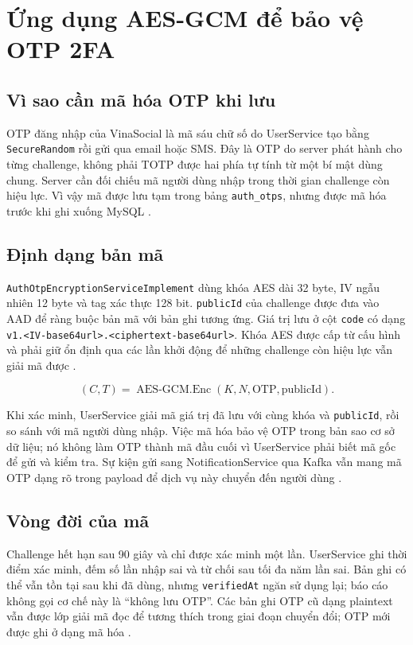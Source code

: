 \section{Ứng dụng AES-GCM để bảo vệ OTP 2FA}
\subsection{Vì sao cần mã hóa OTP khi lưu}
OTP đăng nhập của VinaSocial là mã sáu chữ số do UserService tạo bằng \texttt{SecureRandom} rồi gửi qua email hoặc SMS. Đây là OTP do server phát hành cho từng challenge, không phải TOTP được hai phía tự tính từ một bí mật dùng chung. Server cần đối chiếu mã người dùng nhập trong thời gian challenge còn hiệu lực. Vì vậy mã được lưu tạm trong bảng \texttt{auth\_otps}, nhưng được mã hóa trước khi ghi xuống MySQL \cite{twofa}.

\subsection{Định dạng bản mã}
\texttt{AuthOtpEncryptionServiceImplement} dùng khóa AES dài 32 byte, IV ngẫu nhiên 12 byte và tag xác thực 128 bit. \texttt{publicId} của challenge được đưa vào AAD để ràng buộc bản mã với bản ghi tương ứng. Giá trị lưu ở cột \texttt{code} có dạng \texttt{v1.<IV-base64url>.<ciphertext-base64url>}. Khóa AES được cấp từ cấu hình và phải giữ ổn định qua các lần khởi động để những challenge còn hiệu lực vẫn giải mã được \cite{twofa}.

\begin{equation}
  (C,T)=\operatorname{AES\mbox{-}GCM.Enc}(K,N,\mathrm{OTP},\mathrm{publicId}).
\end{equation}

Khi xác minh, UserService giải mã giá trị đã lưu với cùng khóa và \texttt{publicId}, rồi so sánh với mã người dùng nhập. Việc mã hóa bảo vệ OTP trong bản sao cơ sở dữ liệu; nó không làm OTP thành mã đầu cuối vì UserService phải biết mã gốc để gửi và kiểm tra. Sự kiện gửi sang NotificationService qua Kafka vẫn mang mã OTP dạng rõ trong payload để dịch vụ này chuyển đến người dùng \cite{twofa}.

\subsection{Vòng đời của mã}
Challenge hết hạn sau 90 giây và chỉ được xác minh một lần. UserService ghi thời điểm xác minh, đếm số lần nhập sai và từ chối sau tối đa năm lần sai. Bản ghi có thể vẫn tồn tại sau khi đã dùng, nhưng \texttt{verifiedAt} ngăn sử dụng lại; báo cáo không gọi cơ chế này là ``không lưu OTP''. Các bản ghi OTP cũ dạng plaintext vẫn được lớp giải mã đọc để tương thích trong giai đoạn chuyển đổi; OTP mới được ghi ở dạng mã hóa \cite{twofa}.
